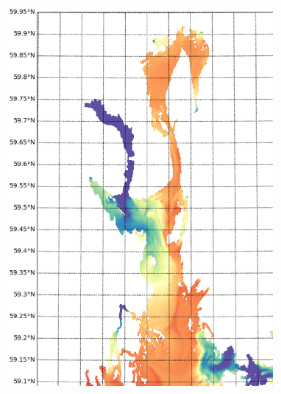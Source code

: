 \documentclass[12pt,a4paper,english]{article}
\begin{document}
\vspace{2mm}

\begin{figure}[!h]
 \begin{center}
  {\includegraphics[height=10cm]{kap5/salt_hele_0_current_crop_forside}}	%
 \end{center}
\end{figure}

\newpage
\newpage

\clearpage
\thispagestyle{empty}  %

\setlength{\unitlength}{1mm}  %
\end{document}
